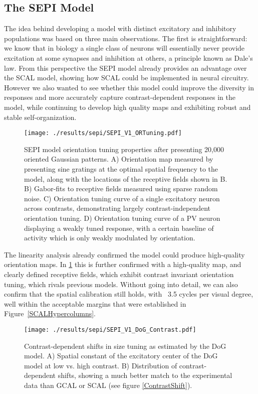 \subsection{The SEPI Model}

The idea behind developing a model with distinct excitatory and
inhibitory populations was based on three main observations. The first
is straightforward: we know that in biology a single class of neurons
will essentially never provide excitation at some synapses and
inhibition at others, a principle known as Dale's law. From this
perspective the SEPI model already provides an advantage over the SCAL
model, showing how SCAL could be implemented in neural
circuitry. However we also wanted to see whether this model could
improve the diversity in responses and more accurately capture
contrast-dependent responses in the model, while continuing to develop
high quality maps and exhibiting robust and stable self-organization.

\begin{figure}
	\centering
    \texttt{[image: ./results/sepi/SEPI\_V1\_ORTuning.pdf]}
	\caption{SEPI model orientation tuning properties after presenting
      20,000 oriented Gaussian patterns. A) Orientation map measured
      by presenting sine gratings at the optimal spatial frequency to
      the model, along with the locations of the receptive fields
      shown in B. B) Gabor-fits to receptive fields measured using
      sparse random noise. C) Orientation tuning curve of a single
      excitatory neuron across contrasts, demonstrating largely
      contrast-independent orientation tuning. D) Orientation tuning
      curve of a PV neuron displaying a weakly tuned response, with a
      certain baseline of activity which is only weakly modulated by
      orientation.}
	\label{SEPIORTuning}
\end{figure}

The linearity analysis already confirmed the model could produce
high-quality orientation maps. In \ref{SEPIORTuning} this is further
confirmed with a high-quality map, and clearly defined receptive
fields, which exhibit contrast invariant orientation tuning, which
rivals previous models. Without going into detail, we can also confirm
that the spatial calibration still holds, with ~3.5 cycles per visual
degree, well within the acceptable margins that were established in
Figure~\ref{SCALHypercolumns}.

\begin{figure}
	\centering
        \texttt{[image: ./results/sepi/SEPI\_V1\_DoG\_Contrast.pdf]}
	\caption{Contrast-dependent shifts in size tuning as estimated by
      the DoG model. A) Spatial constant of the excitatory center of
      the DoG model at low vs. high contrast. B) Distribution of
      contrast-dependent shifts, showing a much better match to the
      experimental data than GCAL or SCAL (see figure
      \ref{ContrastShift}).}
	\label{SEPI_DoG_Contrast}
\end{figure}

